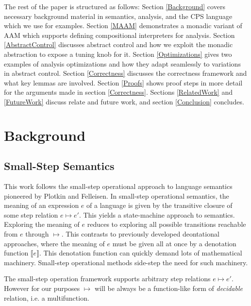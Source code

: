 \documentclass{article}
\begin{document}
The rest of the paper is structured as follows:
Section \ref{Background} covers necessary background material in semantics, analysis, and the CPS language which we use for examples.
Section \ref{MAAM} demonstrates a monadic variant of AAM which supports defining compositional interpreters for analysis.
Section \ref{AbstractControl} discusses abstract control and how we exploit the monadic abstraction to expose a tuning knob for it.
Section \ref{Optimizations} gives two examples of analysis optimizations and how they adapt seamlessly to variations in abstract control.
Section \ref{Correctness} discusses the correctness framework and what key lemmas are involved.
Section \ref{Proofs} shows proof steps in more detail for the arguments made in section \ref{Correctness}.
Sections \ref{RelatedWork} and \ref{FutureWork} discuss relate and future work, and section \ref{Conclusion} concludes.


\section{Background}
\label{section:Background}
 
\subsection{Small-Step Semantics}
\label{section:Background:SmallStepSemantics}

This work follows the small-step operational approach to language semantics pioneered by Plotkin and Felleisen.
In small-step operational semantics, the meaning of an expression $e$ of a language is given by the transitive closure of some step relation $e ↦ e'$.
This yields a state-machine approach to semantics.
Exploring the meaning of $e$ reduces to exploring all possible transitions reachable from $e$ through $↦$.
This contrasts to previously developed deontational approaches, where the meaning of $e$ must be given all at once by a denotation function $⟦ e ⟧$.
This denotation function can quickly demand lots of mathematical machinery.
Small-step operational methods side-step the need for such machinery.

The small-step operation framework supports arbitrary step relations $e ↦ e'$.  
However for our purposes $↦$ will be always be a function-like form of \emph{decidable} relation, i.e. a multifunction.
\end{document}
